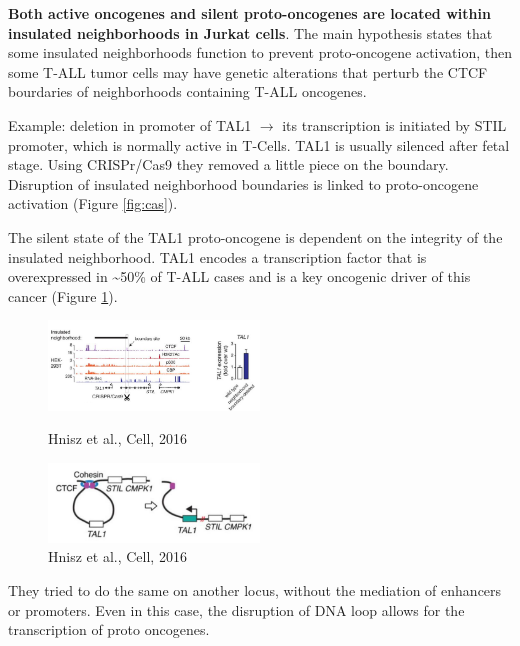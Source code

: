 \textbf{Both active oncogenes and silent proto-oncogenes are located within insulated neighborhoods in Jurkat cells}. 
The main hypothesis states that some insulated neighborhoods function to prevent proto-oncogene activation, then some T-ALL tumor cells may have genetic alterations that perturb the CTCF bourdaries of neighborhoods containing T-ALL oncogenes.

Example: deletion in promoter of TAL1 $\rightarrow$ its transcription is initiated by STIL promoter, which is normally active in T-Cells. TAL1 is usually silenced after fetal stage. Using CRISPr/Cas9 they removed a little piece on the boundary. Disruption of insulated neighborhood boundaries is linked to proto-oncogene activation (Figure \ref{fig:cas}).

The silent state of the TAL1 proto-oncogene is dependent on the integrity of the insulated neighborhood. TAL1 encodes a transcription factor that is overexpressed in \textasciitilde50\% of T-ALL cases and is a key oncogenic driver of this cancer (Figure \ref{fig:tal1}).

\begin{figure}[!htb]
   \begin{minipage}{0.48\textwidth}
     \centering
    \includegraphics[width=0.5\textwidth]{../_resources/bf32b9679af0fb7fcba57b9f87bb4207.png}
\caption{Hnisz et al., Cell, 2016}
\label{fig:cas}
   \end{minipage}\hfill
   \begin{minipage}{0.48\textwidth}
     \centering
    \includegraphics[width=0.5\textwidth]{../_resources/3d83d920d425aa5f76bdbb127596c02b.png}
\caption{Hnisz et al., Cell, 2016}\label{fig:tal1}
   \end{minipage}
\end{figure}

They tried to do the same on another locus, without the mediation of enhancers or promoters. Even in this case,  the disruption of DNA loop allows for the transcription of proto oncogenes.

